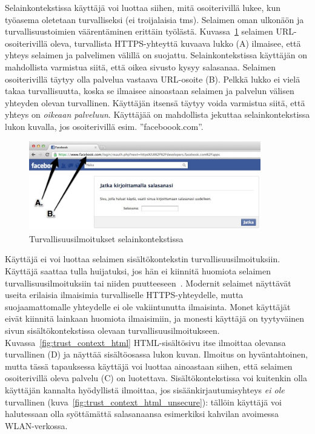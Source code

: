 \documentclass[finnish,gradu]{tktltiki}
\begin{document}
  Selainkontekstissa käyttäjä voi luottaa siihen, mitä osoiterivillä lukee, kun työasema oletetaan turvalliseksi (ei troijalaisia tms). Selaimen oman ulkonäön ja turvallisuustoimien väärentäminen erittäin työlästä. Kuvassa~\ref{fig:facebook_reauth_ab} selaimen URL-osoiterivillä oleva, turvallista HTTPS-yhteyttä kuvaava lukko (A) ilmaisee, että yhteys selaimen ja palvelimen välillä on suojattu. Selainkontekstissa käyttäjän on mahdollista varmistua siitä, että oikea sivusto kysyy salasanaa. Selaimen osoiterivillä täytyy olla palvelua vastaava URL-osoite (B). Pelkkä lukko ei vielä takaa turvallisuutta, koska se ilmaisee ainoastaan selaimen ja palvelun välisen yhteyden olevan turvallinen. Käyttäjän itsensä täytyy voida varmistua siitä, että yhteys on \emph{oikeaan palveluun}. Käyttäjää on mahdollista jekuttaa selainkontekstissa lukon kuvalla, jos osoiterivillä esim. ''faceboook.com''.

  \begin{figure}
    \centering
    \includegraphics[width=0.9\textwidth]{images/Facebook_reauth_ab.jpg}
    \caption{Turvallisuusilmoitukset selainkontekstissa}
    \label{fig:facebook_reauth_ab}
  \end{figure}

  Käyttäjä ei voi luottaa selaimen sisältökontekstin turvallisuusilmoituksiin. Käyttäjä saattaa tulla huijatuksi, jos hän ei kiinnitä huomiota selaimen turvallisuusilmoituksiin tai niiden puutteeseen~\cite{why_phishing_works_06}. Modernit selaimet näyttävät useita erilaisia ilmaisimia turvalliselle HTTPS-yhteydelle, mutta suojaamattomalle yhteydelle ei ole vakiintunutta ilmaisinta. Monet käyttäjät eivät kiinnitä lainkaan huomiota ilmaisimiin, ja monesti käyttäjä on tyytyväinen sivun sisältökontekstissa olevaan turvallisuusilmoitukseen. Kuvassa~\ref{fig:trust_context_html} HTML-sisältösivu itse ilmoittaa olevansa turvallinen (D) ja näyttää sisältöosassa lukon kuvan. Ilmoitus on hyväntahtoinen, mutta tässä tapauksessa käyttäjä voi luottaa ainoastaan siihen, että selaimen osoiterivillä oleva palvelu (C) on luotettava. Sisältökontekstissa voi kuitenkin olla käyttäjän kannalta hyödyllistä ilmoittaa, jos sisäänkirjautumisyhteys \emph{ei ole} turvallinen (kuva~\ref{fig:trust_context_html_unsecure}): tällöin käyttäjä voi halutessaan olla syöttämättä salasanaansa esimerkiksi kahvilan avoimessa WLAN-verkossa.
\end{document}
